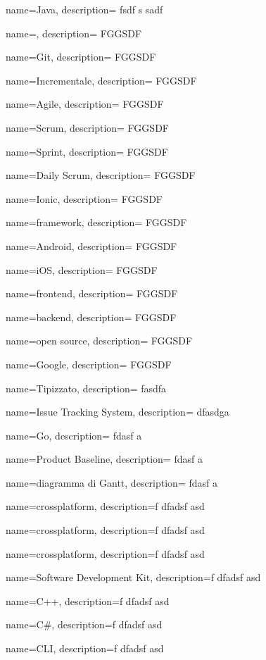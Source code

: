 {
  name=Java,
  description={ fsdf s sadf }
}

{
  name=,
  description={ FGGSDF }
}

{
  name=Git,
  description={ FGGSDF }
}

{
  name=Incrementale,
  description={ FGGSDF }
}

{
  name=Agile,
  description={ FGGSDF }
}

{
  name=Scrum,
  description={ FGGSDF }
}

{
  name=Sprint,
  description={ FGGSDF }
}

{
  name=Daily Scrum,
  description={ FGGSDF }
}

{
  name=Ionic,
  description={ FGGSDF }
}

{
  name=framework,
  description={ FGGSDF }
}

{
  name=Android,
  description={ FGGSDF }
}

{
  name=iOS,
  description={ FGGSDF }
}

{
  name=frontend,
  description={ FGGSDF }
}

{
  name=backend,
  description={ FGGSDF }
}

{
  name=open source,
  description={ FGGSDF }
}

{
  name=Google,
  description={ FGGSDF }
}

{
  name=Tipizzato,
  description= { fasdfa }
}

{
  name=Issue Tracking System,
  description={ dfasdga }
}

{
  name=Go,
  description={ fdasf a}
}


{
  name=Product Baseline,
  description={ fdasf a}
}

{
  name=diagramma di Gantt,
  description={ fdasf a}
}

{
  name=crossplatform,
  description={f dfadsf asd }
}

{
  name=crossplatform,
  description={f dfadsf asd }
}

{
  name=crossplatform,
  description={f dfadsf asd }
}

{
  name=Software Development Kit,
  description={f dfadsf asd }
}


{
  name=C++,
  description={f dfadsf asd }
}

{
  name=C\#,
  description={f dfadsf asd }
}

{
  name=CLI,
  description={f dfadsf asd }
}
